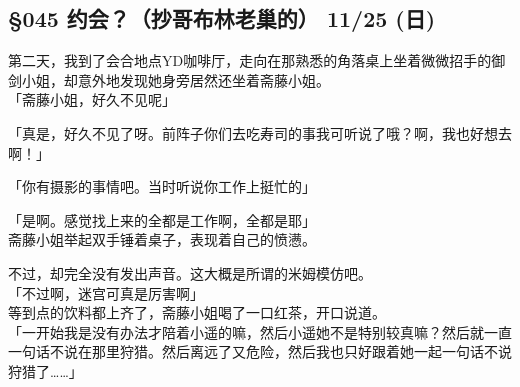 \subsection{§045 约会？（抄哥布林老巢的） 11/25 (日)}

第二天，我到了会合地点YD咖啡厅，走向在那熟悉的角落桌上坐着微微招手的御剑小姐，却意外地发现她身旁居然还坐着斋藤小姐。\\

「斋藤小姐，好久不见呢」

「真是，好久不见了呀。前阵子你们去吃寿司的事我可听说了哦？啊，我也好想去啊！」

「你有摄影的事情吧。当时听说你工作上挺忙的」

「是啊。感觉找上来的全都是工作啊，全都是耶」\\

斋藤小姐举起双手锤着桌子，表现着自己的愤懑。

不过，却完全没有发出声音。这大概是所谓的米姆模仿吧。\\

「不过啊，迷宫可真是厉害啊」\\

等到点的饮料都上齐了，斋藤小姐喝了一口红茶，开口说道。\\

「一开始我是没有办法才陪着小遥的嘛，然后小遥她不是特别较真嘛？然后就一直一句话不说在那里狩猎。然后离远了又危险，然后我也只好跟着她一起一句话不说狩猎了……」\\

